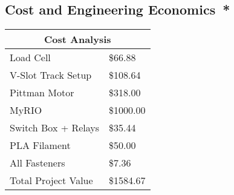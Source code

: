 \subsection*{Cost and Engineering Economics{{\color{red}\ *}}}

\begin{tabular}
	{|l|l|}
	\hline 	
	\multicolumn{2}{c}{Cost Analysis}\\ \hline
	\hline Load Cell & \$66.88 \\ 
	\hline V-Slot Track Setup & \$108.64 \\ 
	\hline Pittman Motor & \$318.00 \\ 
	\hline MyRIO & \$1000.00 \\ 
	\hline Switch Box + Relays & \$35.44 \\ 
	\hline PLA Filament & \$50.00 \\ 
	\hline All Fasteners & \$7.36 \\ \hline
	\hline Total Project Value & \$1584.67 \\ 
	\hline 
\end{tabular} 

